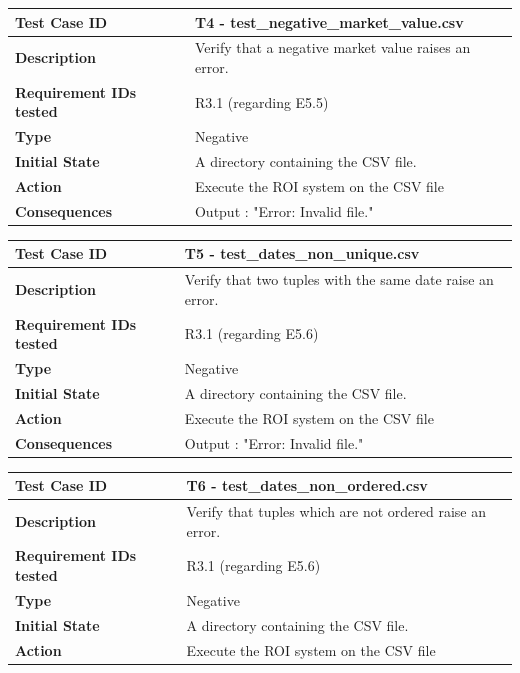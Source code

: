 \documentclass[runningheads,12pt]{article}
\begin{document}
{\begin{tabular}{|p{1.2in}|p{4in}|}
\hline
\end{tabular}
\bigskip
\centering
\begin{tabular}{|p{1.2in}|p{4in}|}
\hline
\textbf{Test Case ID} & T4 - test\_negative\_market\_value.csv \\ 
\hline
\textbf{Description} & Verify that a negative market value raises an error.\\
\hline
\textbf{Requirement IDs tested} & R3.1 (regarding E5.5) \\ 
\hline
\textbf{Type} & Negative \\ 
\hline
\textbf{Initial State} & A directory containing the CSV file.\\
\hline 
\textbf{Action} & Execute the ROI system on the CSV file \\
\hline 
\textbf{Consequences} & Output : "Error: Invalid file." \\ 
\hline
\end{tabular}
\bigskip
\centering
\begin{tabular}{|p{1.2in}|p{4in}|}
\hline
\textbf{Test Case ID} & T5 - test\_dates\_non\_unique.csv \\ 
\hline
\textbf{Description} & Verify that two tuples with the same date raise an error.\\
\hline
\textbf{Requirement IDs tested} & R3.1 (regarding E5.6) \\ 
\hline
\textbf{Type} & Negative \\ 
\hline
\textbf{Initial State} & A directory containing the CSV file.\\
\hline 
\textbf{Action} & Execute the ROI system on the CSV file \\
\hline 
\textbf{Consequences} & Output : "Error: Invalid file." \\ 
\hline
\end{tabular}
\bigskip
\centering
\begin{tabular}{|p{1.2in}|p{4in}|}
\hline
\textbf{Test Case ID} & T6 - test\_dates\_non\_ordered.csv \\ 
\hline
\textbf{Description} & Verify that tuples which are not ordered raise an error.\\
\hline
\textbf{Requirement IDs tested} & R3.1 (regarding E5.6) \\ 
\hline
\textbf{Type} & Negative \\ 
\hline
\textbf{Initial State} & A directory containing the CSV file.\\
\hline 
\textbf{Action} & Execute the ROI system on the CSV file \\

\end{tabular}}
\end{document}
